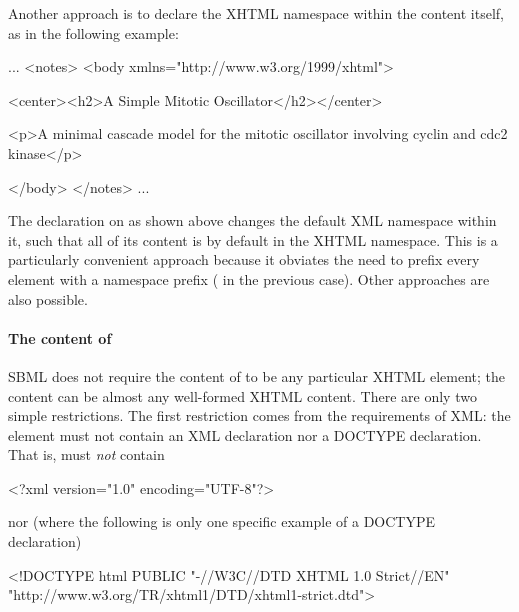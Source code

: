 Another approach is to declare the XHTML namespace within the
 content itself, as in the following example:

\begin{example}
...
<notes>
  <body xmlns="http://www.w3.org/1999/xhtml">

    <center><h2>A Simple Mitotic Oscillator</h2></center>

    <p>A minimal cascade model for the mitotic oscillator
    involving cyclin and cdc2 kinase</p>

  </body>
</notes>
...
\end{example}

The  declaration on
 as shown above changes the default XML namespace
within it, such that all of its content is by default in the XHTML
namespace.  This is a particularly convenient approach because it
obviates the need to prefix every element with a namespace prefix
(\ie {} in the previous case).  Other
approaches are also possible.


\paragraph{The content of }

SBML does not require the content of  to be any
particular XHTML element; the content can be almost any
well-formed XHTML content.  There are only two simple
restrictions.  The first restriction comes from the requirements
of XML: the  element must not contain an XML
declaration nor a DOCTYPE declaration.  That is, 
must \emph{not} contain

\begin{example}
<?xml version="1.0" encoding="UTF-8"?>  
\end{example}

nor (where the following is only one specific example of a
DOCTYPE declaration)

\begin{example}
<!DOCTYPE html PUBLIC "-//W3C//DTD XHTML 1.0 Strict//EN"
 "http://www.w3.org/TR/xhtml1/DTD/xhtml1-strict.dtd">
\end{example}

